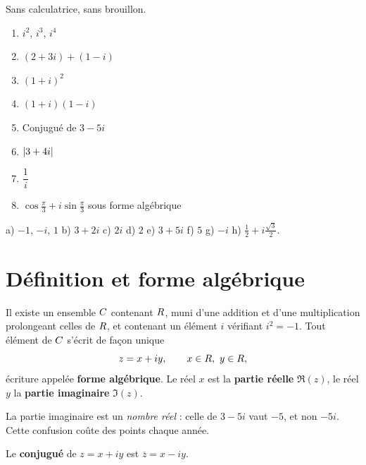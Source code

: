 \begin{automatismes}
Sans calculatrice, sans brouillon.

\begin{enumerate}[label=\textbf{\alph*)}, leftmargin=*, itemsep=0.25em]
  \item $i^{2}$, $i^{3}$, $i^{4}$
  \item $(2+3i)+(1-i)$
  \item $(1+i)^{2}$
  \item $(1+i)(1-i)$
  \item Conjugué de $3-5i$
  \item $\left|3+4i\right|$
  \item $\dfrac{1}{i}$
  \item $\cos\frac{\pi}{3}+i\sin\frac{\pi}{3}$ sous forme algébrique
\end{enumerate}
\end{automatismes}

\begin{corrige}[automatismes]
a) $-1$, $-i$, $1$ \quad b) $3+2i$ \quad c) $2i$ \quad d) $2$ \quad
e) $3+5i$ \quad f) $5$ \quad g) $-i$ \quad
h) $\frac12+i\frac{\sqrt3}{2}$.
\end{corrige}

\section{Définition et forme algébrique}

\begin{definition}
Il existe un ensemble $C$ contenant $R$, muni d'une addition et d'une
multiplication prolongeant celles de $R$, et contenant un élément $i$
vérifiant $i^{2} = -1$. Tout élément de $C$ s'écrit de façon unique
\[
  z = x+iy, \qquad x \in R, \ y \in R,
\]
écriture appelée \textbf{forme algébrique}. Le réel $x$ est la \textbf{partie
réelle} $\Re(z)$, le réel $y$ la \textbf{partie imaginaire} $\Im(z)$.
\end{definition}

\begin{avertissement}
La partie imaginaire est un \emph{nombre réel} : celle de $3-5i$ vaut $-5$, et
non $-5i$. Cette confusion coûte des points chaque année.
\end{avertissement}

\begin{definition}[conjugué]
Le \textbf{conjugué} de $z = x+iy$ est $\overline z = x-iy$.
\end{definition}


